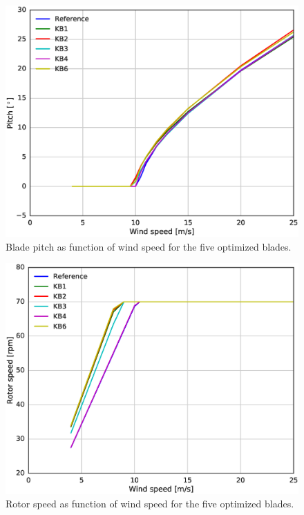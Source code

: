 \begin{figure}[pht]
\begin{center}
	\includegraphics[width=.85\linewidth]{figures/KBcomp_pitch.eps}
\end{center}
\caption{Blade pitch as function of wind speed for the five optimized blades.}
\label{fig:pitch}
\end{figure}

\begin{figure}[pht]
\begin{center}
	\includegraphics[width=.85\linewidth]{figures/KBcomp_rpm.eps}
\end{center}
\caption{Rotor speed as function of wind speed for the five optimized blades.}
\label{fig:rpm}
\end{figure}

\clearpage

